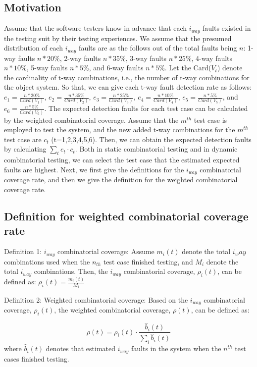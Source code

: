\documentclass[10pt,conference, compsocconf]{IEEEtran}
\begin{document}
\begin{CJK}{UTF8}{gkai}
\subsection{Motivation}
Assume that the software testers know in advance that each $i_{way}$ faults 
existed in the testing suit by their testing experiences.
We assume that the presumed distribution of each $i_{way}$ faults are as the follows out of the 
total faults being $n$:
1-way faults $n*20\%$, 2-way faults $n*35\%$, 3-way faults $n*25\%$, 4-way faults $n*10\%$,
5-way faults $n*5\%$, and 6-way faults $n*5\%$.
Let the Card($V_t$) denote the cardinality of t-way combinations, i.e., 
the number of t-way combinations for the object system.
So that, we can give each t-way fault detection rate as follows:
$e_1=\frac{n*20\%}{Card(V_1)}$, 
$e_2=\frac{n*35\%}{Card(V_2)}$, 
$e_3=\frac{n*25\%}{Card(V_3)}$, 
$e_4=\frac{n*10\%}{Card(V_4)}$, 
$e_5=\frac{n*5\%}{Card(V_5)}$, and
$e_6=\frac{n*5\%}{Card(V_6)}$. 
The expected detection faults for each test case can be calculated by the weighted 
combinatorial coverage. Assume that the $m^{th}$ test case is employed to test the system, 
and the new added t-way combinations for the $m^{th}$ test case are $c_t$ (t=1,2,3,4,5,6).
Then, we can obtain the expected detection faults by calculating $\sum_{t}{e_t\cdot{c_t}}$. 
Both in static combinatorial testing and in dynamic combinatorial testing,
we can select the test case that the estimated expected faults are highest. 
Next, we first give the definitions for the $i_{way}$ combinatorial coverage rate, and 
then we give the definition for the weighted combinatorial coverage rate. 
\subsection{Definition for weighted combinatorial coverage rate} 

Definition 1:
$i_{way}$ combinatorial coverage: 
Assume $m_{i}(t)$ denote the total $i_way$ combinations used when the $n_{th}$ test case 
finished testing, and $M_{i}$ denote the total $i_{way}$ combinations. Then, the $i_{way}$ 
combinatorial coverage, $\rho_{i}(t)$, can be defined as: 
$\rho_{i}(t)=\frac{m_{i}(t)}{M_{i}}$

Definition 2:
Weighted combinatorial coverage:
Based on the $i_{way}$ combinatorial coverage, $\rho_{i}(t)$, the weighted combinatorial coverage,
$\rho(t)$, can be defined as:

\begin{equation}
\label{weighted_combinatorial_original}
\rho(t)=\rho_{i}(t)\cdot{\frac{\hat{b}_i(t)}{\sum_i{\hat{b}_i(t)}}}
\end{equation}
where $\hat{b}_i(t)$ denotes that estimated $i_{way}$ faults in the system
when the $n^{th}$ test cases finished testing. 


\end{CJK}
\end{document}

